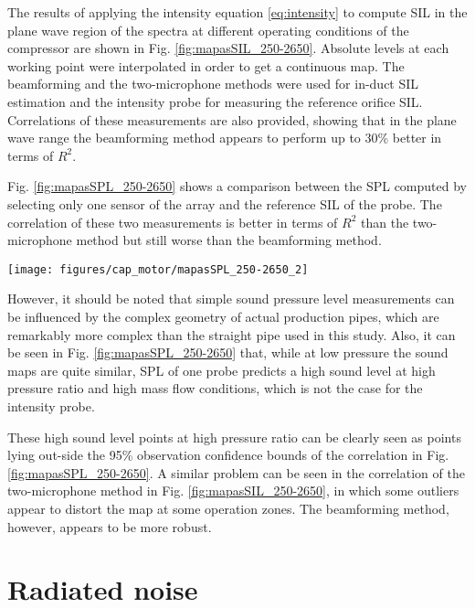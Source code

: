 The results of applying the intensity equation \ref{eq:intensity} to compute SIL in the plane wave region of the spectra at different operating conditions of the compressor are shown in Fig. \ref{fig:mapasSIL_250-2650}. Absolute levels at each working point were interpolated in order to get a continuous map. The beamforming and the two-microphone methods were used for in-duct SIL estimation and the intensity probe for measuring the reference orifice SIL. Correlations of these measurements are also provided, showing that in the plane wave range the beamforming method appears to perform up to 30\% better in terms of $R^2$.

Fig. \ref{fig:mapasSPL_250-2650} shows a comparison between the SPL computed by selecting only one sensor of the array and the reference SIL of the probe. The correlation of these two measurements is better in terms of $R^2$ than the two-microphone method but still worse than the beamforming method.

\begin{figure*}[tb!]
\centering
\texttt{[image: figures/cap\_motor/mapasSPL\_250-2650\_2]}
\caption{Comparison of compressor sound maps (plane wave region) obtained through interpolation of SPL at the inlet 1st sensor and SIL at the probe, including a correlation between both.}
\label{fig:mapasSPL_250-2650}
\end{figure*}

However, it should be noted that simple sound pressure level measurements can be influenced by the complex geometry of actual production pipes, which are remarkably more complex than the straight pipe used in this study. Also, it can be seen in Fig. \ref{fig:mapasSPL_250-2650} that, while at low pressure the sound maps are quite similar, SPL of one probe predicts a high sound level at high pressure ratio and high mass flow conditions, which is not the case for the intensity probe.

These high sound level points at high pressure ratio can be clearly seen as points lying out-side the 95\% observation confidence bounds of the correlation in Fig. \ref{fig:mapasSPL_250-2650}. A similar problem can be seen in the correlation of the two-microphone method in Fig. \ref{fig:mapasSIL_250-2650}, in which some outliers appear to distort the map at some operation zones. The beamforming method, however, appears to be more robust.

\section{Radiated noise}
\label{sub:radiated_noise_measurement}

